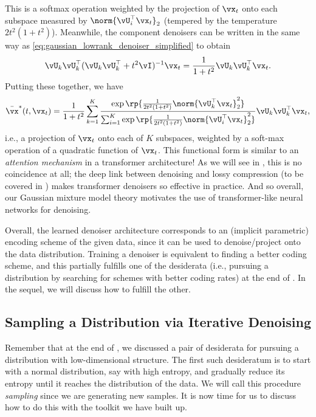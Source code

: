 \documentclass[../../book-main.tex]{subfiles}
\begin{document}
This is a softmax operation weighted by the projection of \(\vx_{t}\) onto each subspace measured by \(\norm{\vU_{i}^{\top}\vx_{t}}_{2}\) (tempered by the temperature \(2t^{2}(1 + t^{2})\)). Meanwhile, the component denoisers can be written in the same way as \eqref{eq:gaussian_lowrank_denoiser_simplified} to obtain 
\begin{equation}
	\vU_{k}\vU_{k}^{\top}(\vU_{k}\vU_{k}^{\top} + t^{2}\vI)^{-1}\vx_{t} = \frac{1}{1 + t^{2}}\vU_{k}\vU_{k}^{\top}\vx_{t}.
\end{equation}
Putting these together, we have 
\begin{equation}\label{eq:gmm_lowrank_denoiser}
	\bar{\vx}^{\ast}(t, \vx_{t}) = \frac{1}{1 + t^{2}}\sum_{k = 1}^{K}\frac{\exp\rp{\frac{1}{2t^{2}(1 + t^{2})}\norm{\vU_{k}^{\top}\vx_{t}}_{2}^{2}}}{\sum_{i = 1}^{K}\exp\rp{\frac{1}{2t^{2}(1 + t^{2})}\norm{\vU_{i}^{\top}\vx_{t}}_{2}^{2}}}\vU_{k}\vU_{k}^{\top}\vx_{t},
\end{equation}
i.e., a projection of \(\vx_{t}\) onto each of \(K\) subspaces, weighted by a soft-max operation of a quadratic function of \(\vx_{t}\). This functional form is similar to an \textit{attention mechanism} in a transformer architecture! As we will see in , this is no coincidence at all; the deep link between denoising and lossy compression (to be covered in ) makes transformer denoisers so effective in practice. And so overall, our Gaussian mixture model theory motivates the use of transformer-like neural networks for denoising.

Overall, the learned denoiser architecture corresponds to an (implicit parametric) encoding scheme of the given data, since it can be used to denoise/project onto the data distribution. Training a denoiser is equivalent to finding a better coding scheme, and this partially fulfills one of the desiderata (i.e., pursuing a distribution by searching for schemes with better coding rates) at the end of . In the sequel, we will discuss how to fulfill the other.



\subsection{Sampling a Distribution via Iterative Denoising}\label{sub:sampling_denoising}

Remember that at the end of , we discussed a pair of desiderata for pursuing a distribution with low-dimensional structure. The first such desideratum is to start with a normal distribution, say with high entropy, and gradually reduce its entropy until it reaches the distribution of the data. We will call this procedure \textit{sampling} since we are generating new samples. It is now time for us to discuss how to do this with the toolkit we have built up.
\end{document}
